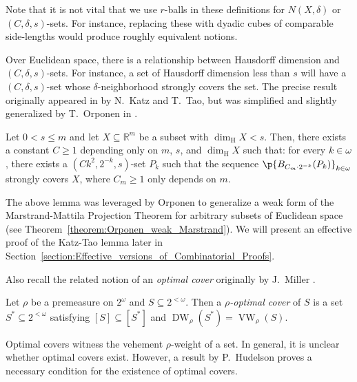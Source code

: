 Note that it is not vital that we use $r$-balls in these definitions for $N(X, \delta)$ or $(C, \delta, s)$-sets. For instance, replacing these with dyadic cubes of comparable side-lengths would produce roughly equivalent notions. %

Over Euclidean space, there is a relationship between Hausdorff dimension and $(C, \delta, s)$-sets. For instance, a set of Hausdorff dimension less than $s$ will have a $(C, \delta, s)$-set whose $\delta$-neighborhood strongly covers the set. The precise result originally appeared in \cite{KT01} by N.~Katz and T.~Tao, but was simplified and slightly generalized by T.~Orponen in \cite{Orp21}.

\begin{lemma}
    \label{lemma:Katz_Tao}
    Let $0 < s \leq m$ and let $X \subseteq \mathbb{R}^m$ be a subset with $\dim_{\operatorname{H}} X < s$. Then, there exists a constant $C \geq 1$ depending only on $m$, $s$, and $\dim_{\operatorname{H}} X$ such that: for every $k \in \omega$, there exists a $(Ck^2, 2^{-k}, s)$-set $P_k$ such that the sequence $\p{B_{C_m \cdot 2^{-k}}(P_k)}_{k \in \omega}$ strongly covers $X$, where $C_m \geq 1$ only depends on $m$.
\end{lemma}

The above lemma was leveraged by Orponen to generalize a weak form of the Marstrand-Mattila Projection Theorem for arbitrary subsets of Euclidean space \cite{Orp21} (see Theorem~\ref{theorem:Orponen_weak_Marstrand}). We will present an effective proof of the Katz-Tao lemma later in Section~\ref{section:Effective_versions_of_Combinatorial_Proofs}.

Also recall the related notion of an \textit{optimal cover} originally by J.~Miller \cite{Mil11}. 
\begin{definition}
    \label{definition:optimal_cover}
    Let $\rho$ be a premeasure on $2^\omega$ and $S \subseteq 2^{<\omega}$. Then a \textit{$\rho$-optimal cover} of $S$ is a set $S^* \subseteq 2^{<\omega}$ satisfying $[S] \subseteq [S^*]$ and $\operatorname{DW}_\rho(S^*) = \operatorname{VW}_\rho(S)$.
\end{definition}

Optimal covers witness the vehement $\rho$-weight of a set. In general, it is unclear whether optimal covers exist. However, a result by P.~Hudelson proves a necessary condition for the existence of optimal covers. 

